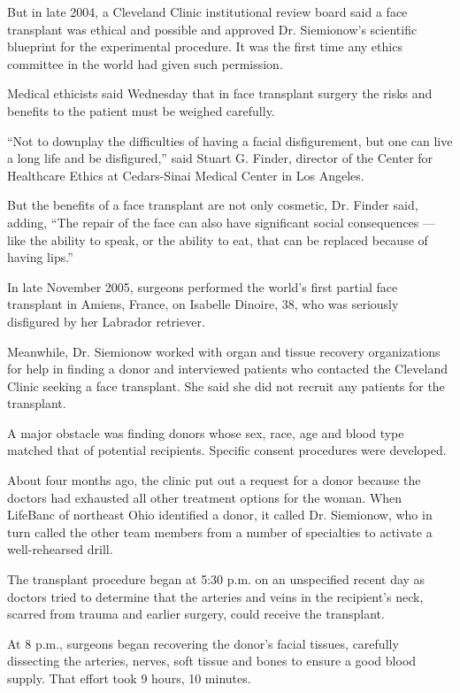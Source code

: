 But in late 2004, a Cleveland Clinic institutional review board said a
face transplant was ethical and possible and approved Dr. Siemionow's
scientific blueprint for the experimental procedure. It was the first
time any ethics committee in the world had given such permission.

Medical ethicists said Wednesday that in face transplant surgery the
risks and benefits to the patient must be weighed carefully.

``Not to downplay the difficulties of having a facial disfigurement, but
one can live a long life and be disfigured,'' said Stuart G. Finder,
director of the Center for Healthcare Ethics at Cedars-Sinai Medical
Center in Los Angeles.

But the benefits of a face transplant are not only cosmetic, Dr. Finder
said, adding, ``The repair of the face can also have significant social
consequences --- like the ability to speak, or the ability to eat, that
can be replaced because of having lips.''

In late November 2005, surgeons performed the world's first partial face
transplant in Amiens, France, on Isabelle Dinoire, 38, who was seriously
disfigured by her Labrador retriever.

Meanwhile, Dr. Siemionow worked with organ and tissue recovery
organizations for help in finding a donor and interviewed patients who
contacted the Cleveland Clinic seeking a face transplant. She said she
did not recruit any patients for the transplant.

A major obstacle was finding donors whose sex, race, age and blood type
matched that of potential recipients. Specific consent procedures were
developed.

About four months ago, the clinic put out a request for a donor because
the doctors had exhausted all other treatment options for the woman.
When LifeBanc of northeast Ohio identified a donor, it called Dr.
Siemionow, who in turn called the other team members from a number of
specialties to activate a well-rehearsed drill.

The transplant procedure began at 5:30 p.m. on an unspecified recent day
as doctors tried to determine that the arteries and veins in the
recipient's neck, scarred from trauma and earlier surgery, could receive
the transplant.

At 8 p.m., surgeons began recovering the donor's facial tissues,
carefully dissecting the arteries, nerves, soft tissue and bones to
ensure a good blood supply. That effort took 9 hours, 10 minutes.

